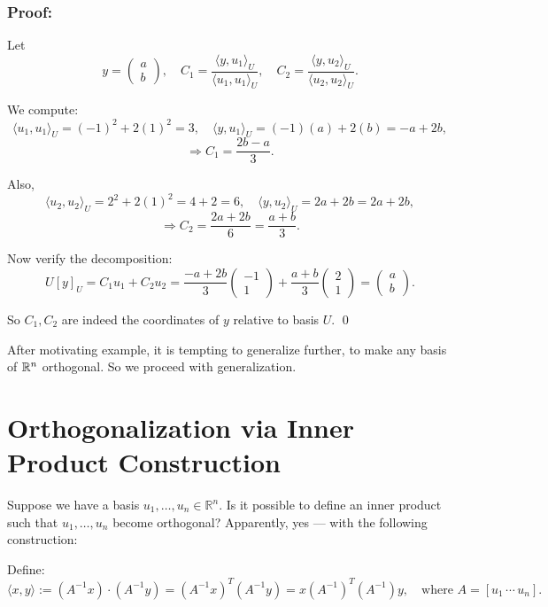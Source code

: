 \documentclass{article}
\begin{document}
\subsubsection*{Proof:}

Let
\[
y = \begin{pmatrix} a \\ b \end{pmatrix}, \quad 
C_1 = \frac{\langle y, u_1 \rangle_U}{\langle u_1, u_1 \rangle_U}, \quad 
C_2 = \frac{\langle y, u_2 \rangle_U}{\langle u_2, u_2 \rangle_U}.
\]

We compute:
\[
\langle u_1, u_1 \rangle_U = (-1)^2 + 2(1)^2 = 3, \quad
\langle y, u_1 \rangle_U = (-1)(a) + 2(b) = -a + 2b,
\]
\[
\Rightarrow C_1 = \frac{2b - a}{3}.
\]

Also,
\[
\langle u_2, u_2 \rangle_U = 2^2 + 2(1)^2 = 4 + 2 = 6, \quad
\langle y, u_2 \rangle_U = 2a + 2b = 2a + 2b,
\]
\[
\Rightarrow C_2 = \frac{2a + 2b}{6} = \frac{a + b}{3}.
\]

Now verify the decomposition:
\[
U[y]_U = C_1 u_1 + C_2 u_2 = 
\frac{-a + 2b}{3} \begin{pmatrix} -1 \\ 1 \end{pmatrix} 
+ \frac{a + b}{3} \begin{pmatrix} 2 \\ 1 \end{pmatrix}
= \begin{pmatrix} a \\ b \end{pmatrix}.
\]

So \( C_1, C_2 \) are indeed the coordinates of \( y \) relative to basis \( U \). \qed

\bigskip

After motivating example, it is tempting to generalize further, to make any basis of \( \mathbb{R}^n \) orthogonal. So we proceed with generalization.

\section*{Orthogonalization via Inner Product Construction}

Suppose we have a basis \( u_1, \ldots, u_n \in \mathbb{R}^n \). Is it possible to define an inner product such that \( u_1, \ldots, u_n \) become orthogonal? Apparently, yes --- with the following construction:

Define:
\[
  \langle x, y \rangle :=  (A^{-1}x) \cdot (A^{-1}y) = (A^{-1}x)^T (A^{-1}y) = x (A^{-1})^T(A^{-1})y, \quad \text{where } A = [u_1\,\cdots\,u_n].
\]
\end{document}
